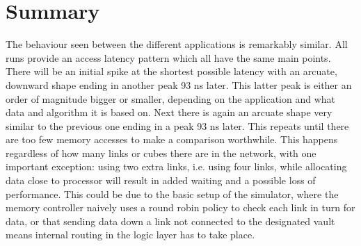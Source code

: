 

\section{Summary}
The behaviour seen between the different applications is remarkably similar. All runs provide an access latency pattern which all have the same main points. There will be an initial spike at the shortest possible latency with an arcuate, downward shape ending in another peak 93 ns later. This latter peak is either an order of magnitude bigger or smaller, depending on the application and what data and algorithm it is based on. Next there is again an arcuate shape very similar to the previous one ending in a peak 93 ns later. This repeats until there are too few memory accesses to make a comparison worthwhile. This happens regardless of how many links or cubes there are in the network, with one important exception: using two extra links, i.e. using four links, while allocating data close to processor will result in added waiting and a possible loss of performance. This could be due to the basic setup of the simulator, where the memory controller naively uses a round robin policy to check each link in turn for data, or that sending data down a link not connected to the designated vault means internal routing in the logic layer has to take place.
\bigskip

